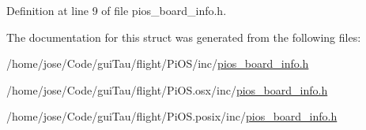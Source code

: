 Definition at line 9 of file pios\-\_\-board\-\_\-info.\-h.



The documentation for this struct was generated from the following files\-:\begin{DoxyCompactItemize}
\item 
/home/jose/\-Code/gui\-Tau/flight/\-Pi\-O\-S/inc/\hyperlink{inc_2pios__board__info_8h}{pios\-\_\-board\-\_\-info.\-h}\item 
/home/jose/\-Code/gui\-Tau/flight/\-Pi\-O\-S.\-osx/inc/\hyperlink{osx_2inc_2pios__board__info_8h}{pios\-\_\-board\-\_\-info.\-h}\item 
/home/jose/\-Code/gui\-Tau/flight/\-Pi\-O\-S.\-posix/inc/\hyperlink{posix_2inc_2pios__board__info_8h}{pios\-\_\-board\-\_\-info.\-h}\end{DoxyCompactItemize}
